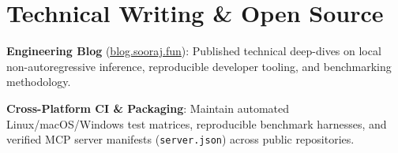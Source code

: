 \documentclass[letterpaper,11pt]{article}
\begin{document}
\section{Technical Writing \& Open Source}
 \begin{itemize}[leftmargin=0.15in, label=\textbullet]
    \small{
     \item \textbf{Engineering Blog} (\href{https://blog.sooraj.fun}{\underline{blog.sooraj.fun}}): Published technical deep-dives on local non-autoregressive inference, reproducible developer tooling, and benchmarking methodology.
     \item \textbf{Cross-Platform CI \& Packaging}: Maintain automated Linux/macOS/Windows test matrices, reproducible benchmark harnesses, and verified MCP server manifests (\texttt{server.json}) across public repositories.
    }
 \end{itemize}
\end{document}
